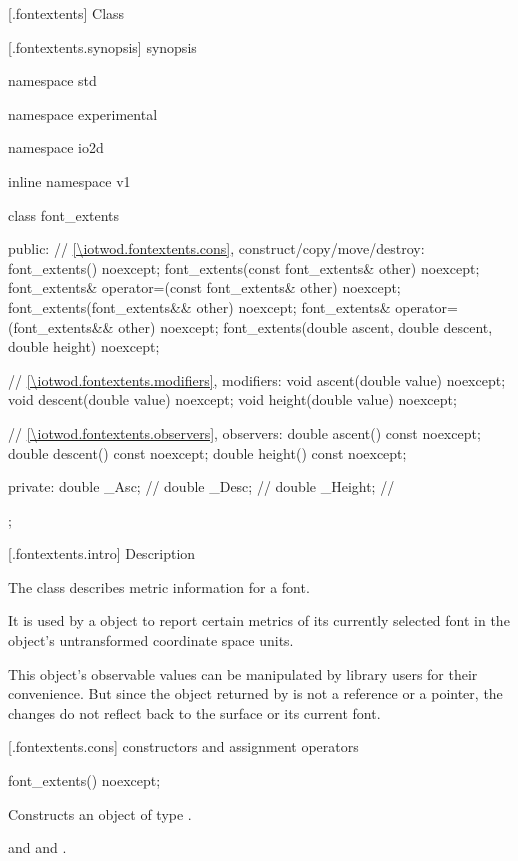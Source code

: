  [\iotwod.fontextents] {Class }

 [\iotwod.fontextents.synopsis] { synopsis}

\begin{codeblock}
namespace std { namespace experimental { namespace io2d { inline namespace v1 {
  class font_extents {
  public:
    // \ref{\iotwod.fontextents.cons}, construct/copy/move/destroy:
    font_extents() noexcept;
    font_extents(const font_extents& other) noexcept;
    font_extents& operator=(const font_extents& other) noexcept;
    font_extents(font_extents&& other) noexcept;
    font_extents& operator=(font_extents&& other) noexcept;
    font_extents(double ascent, double descent, double height) noexcept;

    // \ref{\iotwod.fontextents.modifiers}, modifiers:
    void ascent(double value) noexcept;
    void descent(double value) noexcept;
    void height(double value) noexcept;

    // \ref{\iotwod.fontextents.observers}, observers:
    double ascent() const noexcept;
    double descent() const noexcept;
    double height() const noexcept;

  private:
    double _Asc;    // \expos
    double _Desc;   // \expos
    double _Height; // \expos
  };
} } } }
\end{codeblock}

 [\iotwod.fontextents.intro] { Description}

\pnum
{}
The class  describes metric information for a font.

\pnum
It is used by a  object to report certain metrics of its currently selected font in the  object's untransformed coordinate space units.

\pnum
\enternote
This object's observable values can be manipulated by library users for their convenience. But since the  object returned by  is not a reference or a pointer, the changes do not reflect back to the surface or its current font.
\exitnote

 [\iotwod.fontextents.cons] { constructors and assignment operators}

\begin{itemdecl}
    font_extents() noexcept;
\end{itemdecl}
\begin{itemdescr}
	\pnum
	\effects
	Constructs an object of type .
	
	\pnum
	\postconditions
	 and  and .
\end{itemdescr}

